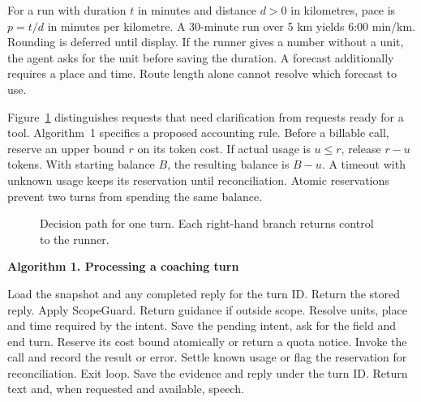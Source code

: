 \documentclass[conference]{IEEEtran}
\begin{document}
For a run with duration $t$ in minutes and distance $d>0$ in kilometres, pace is $p=t/d$ in minutes per kilometre. A 30-minute run over 5 km yields 6:00 min/km. Rounding is deferred until display. If the runner gives a number without a unit, the agent asks for the unit before saving the duration. A forecast additionally requires a place and time. Route length alone cannot resolve which forecast to use.

Figure~\ref{fig:flow} distinguishes requests that need clarification from requests ready for a tool. Algorithm~1 specifies a proposed accounting rule. Before a billable call, reserve an upper bound $r$ on its token cost. If actual usage is $u\leq r$, release $r-u$ tokens. With starting balance $B$, the resulting balance is $B-u$. A timeout with unknown usage keeps its reservation until reconciliation. Atomic reservations prevent two turns from spending the same balance.

\begin{figure}[htbp]\centering
{}
\caption{Decision path for one turn. Each right-hand branch returns control to the runner.}\label{fig:flow}
\end{figure}

\par\smallskip\noindent\textbf{Algorithm 1. Processing a coaching turn}\par
\begin{algorithmic}[1]
\STATE Load the snapshot and any completed reply for the turn ID.
  \STATE Return the stored reply.
\ENDIF
\STATE Apply ScopeGuard. Return guidance if outside scope.
\STATE Resolve units, place and time required by the intent.
  \STATE Save the pending intent, ask for the field and end turn.
\ENDIF
{}
  \STATE Reserve its cost bound atomically or return a quota notice.
  \STATE Invoke the call and record the result or error.
  \STATE Settle known usage or flag the reservation for reconciliation.
    \STATE Exit loop.
  \ENDIF
\ENDFOR
\STATE Save the evidence and reply under the turn ID.
\STATE Return text and, when requested and available, speech.
\end{algorithmic}
\end{document}
